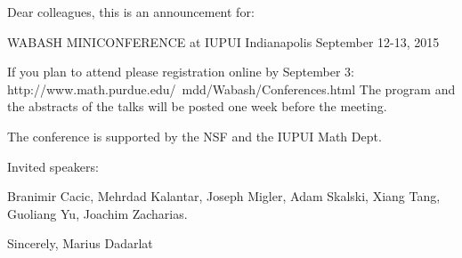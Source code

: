 Dear colleagues, this is an announcement for:

          WABASH MINICONFERENCE
         at IUPUI Indianapolis
            September 12-13, 2015

 If you plan to attend please registration online by September 3:
 http://www.math.purdue.edu/~mdd/Wabash/Conferences.html
 The program and the abstracts of the talks will be posted one week before
 the meeting.

 The conference is supported by the NSF and the IUPUI Math Dept.

 Invited speakers:

Branimir Cacic, 
Mehrdad Kalantar, 
Joseph Migler,
Adam Skalski,
Xiang Tang,
Guoliang Yu,
Joachim Zacharias.


Sincerely,
                   Marius Dadarlat

